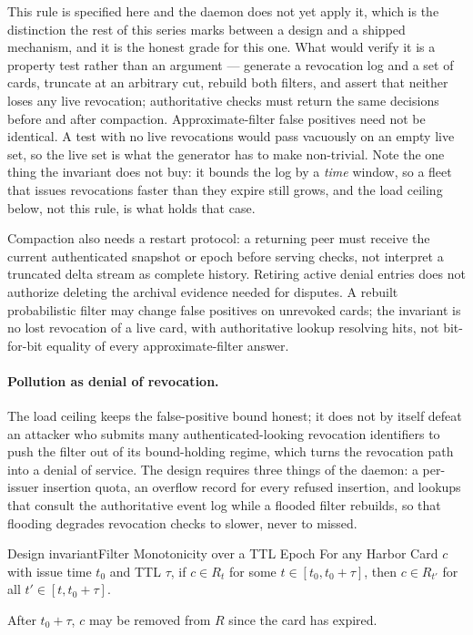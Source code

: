 \documentclass[11pt,a4paper]{article}
\theoremstyle{definition}
\begin{document}
This rule is specified here and the daemon does not yet apply it, which is the
distinction the rest of this series marks between a design and a shipped mechanism,
and it is the honest grade for this one. What would verify it is a property test
rather than an argument --- generate a revocation log and a set of cards, truncate at an arbitrary
cut, rebuild both filters, and assert that neither loses any live revocation;
authoritative checks must return the same decisions before and after compaction.
Approximate-filter false positives need not be identical. A test with no live
revocations would pass vacuously on an
empty live set, so the live set is what the generator has to make non-trivial. Note
the one thing the invariant does not buy: it bounds the log by a \emph{time} window,
so a fleet that issues revocations faster than they expire still grows, and the load
ceiling below, not this rule, is what holds that case.

Compaction also needs a restart protocol: a returning peer must receive the
current authenticated snapshot or epoch before serving checks, not interpret a
truncated delta stream as complete history. Retiring active denial entries does
not authorize deleting the archival evidence needed for disputes. A rebuilt
probabilistic filter may change false positives on unrevoked cards; the invariant
is no lost revocation of a live card, with authoritative lookup resolving hits,
not bit-for-bit equality of every approximate-filter answer.

\paragraph{Pollution as denial of revocation.} The load ceiling keeps the false-positive bound honest; it does not by itself defeat an attacker who submits many authenticated-looking revocation identifiers to push the filter out of its bound-holding regime, which turns the revocation path into a denial of service. The design requires three things of the daemon: a per-issuer insertion quota, an overflow record for every refused insertion, and lookups that consult the authoritative event log while a flooded filter rebuilds, so that flooding degrades revocation checks to slower, never to missed.

\begin{pdclaim}{Design invariant}{Filter Monotonicity over a TTL Epoch}
\setlength{\parskip}{4pt plus 1pt}
\label{prop:filter-mono}
For any Harbor Card $c$ with issue time $t_0$ and TTL $\tau$, if $c \in R_t$ for some $t \in [t_0, t_0+\tau]$, then $c \in R_{t'}$ for all $t' \in [t, t_0+\tau]$.

After $t_0+\tau$, $c$ may be removed from $R$ since the card has expired.
\end{pdclaim}
\end{document}
